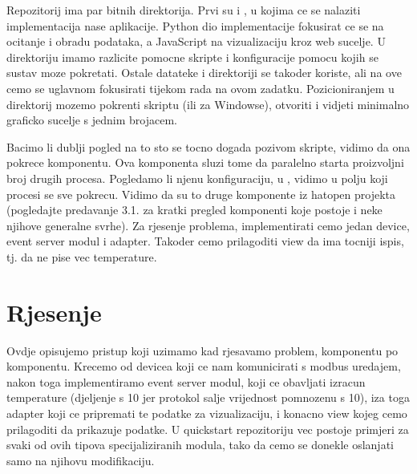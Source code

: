\documentclass[letterpaper,10pt,croatian]{sphinxmanual}
\begin{document}
\sphinxAtStartPar
Repozitorij ima par bitnih direktorija. Prvi su  i , u
kojima ce se nalaziti implementacija nase aplikacije. Python dio implementacije
fokusirat ce se na ocitanje i obradu podataka, a JavaScript na vizualizaciju
kroz web sucelje. U  direktoriju imamo razlicite pomocne skripte
i konfiguracije pomocu kojih se sustav moze pokretati. Ostale datateke i
direktoriji se takoder koriste, ali na ove cemo se uglavnom fokusirati tijekom
rada na ovom zadatku. Pozicioniranjem u direktorij  mozemo
pokrenti skriptu  (ili  za Windowse), otvoriti
 i vidjeti minimalno graficko sucelje s jednim brojacem.

\sphinxAtStartPar
Bacimo li dublji pogled na to sto se tocno dogada pozivom  skripte,
vidimo da ona pokrece  komponentu. Ova komponenta sluzi
tome da paralelno starta proizvoljni broj drugih procesa. Pogledamo li njenu
konfiguraciju, u , vidimo u
 polju koji procesi se sve pokrecu. Vidimo da su to druge
komponente iz hat\sphinxhyphen{}open projekta (pogledajte predavanje 3.1. za kratki pregled
komponenti koje postoje i neke njihove generalne svrhe). Za rjesenje problema,
implementirati cemo jedan device, event server modul i adapter. Takoder cemo
prilagoditi view da ima tocniji ispis, tj. da ne pise  vec
temperature.


\section{Rjesenje}
\label{\detokenize{03-hat-modbus-workshop/index:rjesenje}}
\sphinxAtStartPar
Ovdje opisujemo pristup koji uzimamo kad rjesavamo problem, komponentu po
komponentu. Krecemo od devicea koji ce nam komunicirati s modbus uredajem,
nakon toga implementiramo event server modul, koji ce obavljati izracun
temperature (djeljenje s 10 jer protokol salje vrijednost pomnozenu s 10), iza
toga adapter koji ce pripremati te podatke za vizualizaciju, i konacno view
kojeg cemo prilagoditi da prikazuje podatke. U quickstart repozitoriju vec
postoje primjeri za svaki od ovih tipova specijaliziranih modula, tako da cemo
se donekle oslanjati samo na njihovu modifikaciju.
\end{document}
